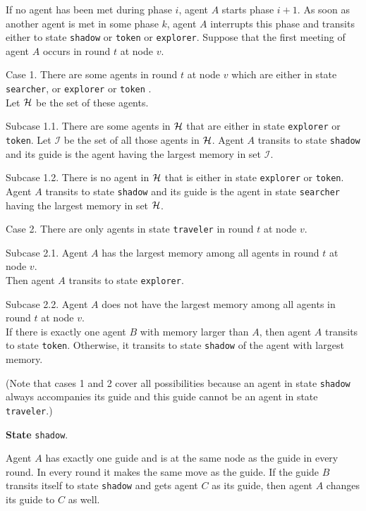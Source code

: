 \documentclass[11pt]{article}
\newcommand{\cH}{{\cal H}}
\begin{document}
 {If no agent has been met during phase $i$, agent $A$ starts phase $i+1$.} As soon as another agent is met in some phase $k$, agent $A$
 interrupts this phase and transits either to state
 {\tt shadow} or {\tt token} or {\tt explorer}. Suppose that the first meeting of agent $A$ occurs in round $t$ at node $v$.
 
 \noindent
 Case 1. There are some agents  in round $t$ at node $v$ which are either in state  {\tt searcher}, or {\tt explorer} or  {\tt token} .\\
 Let $\cH$ be the set of these agents.
 
{ Subcase 1.1.
 There are some agents in $\cH$ that are either in state {\tt explorer} or {\tt token}. Let $\mathcal{I}$ be the set of all those agents in $\cH$.
 Agent $A$ transits to state {\tt shadow} and its guide is the agent having the largest memory in set $\mathcal{I}$.}
 
{Subcase 1.2.
 There is no agent in $\cH$ that is either in state {\tt explorer} or {\tt token}. Agent $A$ transits to state {\tt shadow} and its guide is the agent in state {\tt searcher} having the largest memory in set $\cH$.}

 
 \noindent
 Case 2. There are only agents in state {\tt traveler} in round $t$ at node $v$.
 
 Subcase 2.1.
 Agent $A$  has the largest memory among all agents in round $t$ at node $v$.\\
 Then agent $A$  transits to state {\tt explorer}.
 
 Subcase 2.2.
 Agent $A$  does not have the largest memory among all agents in round $t$ at node $v$.\\
 If there is exactly one agent $B$  with memory larger than $A$, then agent $A$ transits to state {\tt token}.
 Otherwise, it transits to state {\tt shadow} of the agent  with largest memory.
 
 (Note that cases 1 and 2 cover all possibilities because 
 an agent in state {\tt shadow} always accompanies its guide and this guide cannot be an agent in state {\tt traveler}.)
 
 \vspace*{0.2cm}
  \noindent
 {\bf State} {\tt shadow}.
 
 Agent $A$ has exactly one guide and is at  the same node as the guide in every round. In every round it makes the same move as the guide.
 If the guide $B$ transits itself to state  {\tt shadow} and gets agent $C$ as its guide, then agent $A$ changes its guide to $C$ as well.  
\end{document}
